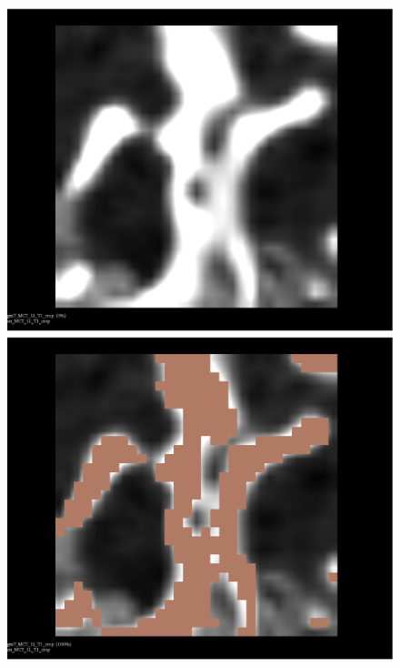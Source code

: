 \documentclass{InsightArticle}
\begin{document}
\begin{figure}[H]
  \begin{center}
    \includegraphics[scale=0.115]{figures/Ntotal.eps}
    \includegraphics[scale=0.115]{figures/Nbone.eps}

\end{center}
\end{figure}
\end{document}
